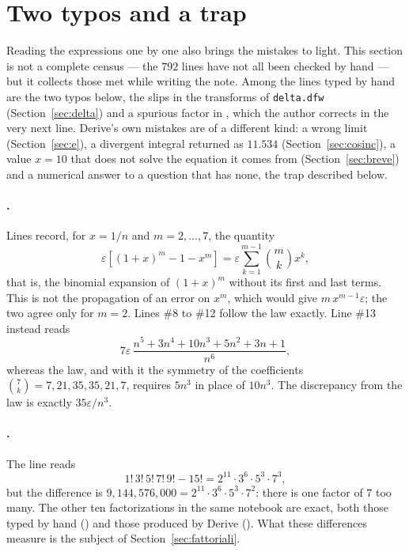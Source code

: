 \section{Two typos and a trap}
\label{sec:refusi}

Reading the expressions one by one also brings the mistakes to light. This
section is not a complete census --- the $792$ lines have not all been checked
by hand --- but it collects those met while writing the note. Among the lines
typed by hand are the two typos below, the slips in the transforms of
\texttt{delta.dfw} (Section~\ref{sec:delta}) and a spurious factor in
, which the author corrects in the very next line.
Derive's own mistakes are of a different kind: a wrong limit
(Section~\ref{sec:e}), a divergent integral returned as $11.534$
(Section~\ref{sec:cosinc}), a value $x=10$ that does not solve the equation it
comes from (Section~\ref{sec:breve}) and a numerical answer to a question that
has none, the trap described below.

\paragraph{.}
Lines  record, for $x=1/n$ and $m=2,\dots,7$, the
quantity
\[
  \varepsilon\left[(1+x)^m-1-x^m\right]
  =\varepsilon\sum_{k=1}^{m-1}\binom{m}{k}x^k ,
\]
that is, the binomial expansion of $(1+x)^m$ without its first and last
terms. This is not the propagation of an error on $x^m$, which would give
$m\,x^{m-1}\varepsilon$; the two agree only for $m=2$. Lines \#8 to \#12
follow the law exactly. Line \#13 instead reads
\[
  7\varepsilon\,\frac{n^5+3n^4+10n^3+5n^2+3n+1}{n^6},
\]
whereas the law, and with it the symmetry of the coefficients
$\binom{7}{k}=7,21,35,35,21,7$, requires $5n^3$ in place of $10n^3$. The
discrepancy from the law is exactly $35\varepsilon/n^3$.

\paragraph{.}
The line reads
\[
  1!\,3!\,5!\,7!\,9!-15!=2^{11}\cdot 3^{6}\cdot 5^{3}\cdot 7^{3},
\]
but the difference is $9{,}144{,}576{,}000=2^{11}\cdot3^{6}\cdot5^{3}\cdot7^{2}$:
there is one factor of $7$ too many. The other ten factorizations in the same
notebook are exact, both those typed by hand () and
those produced by Derive (). What these differences
measure is the subject of Section~\ref{sec:fattoriali}.

